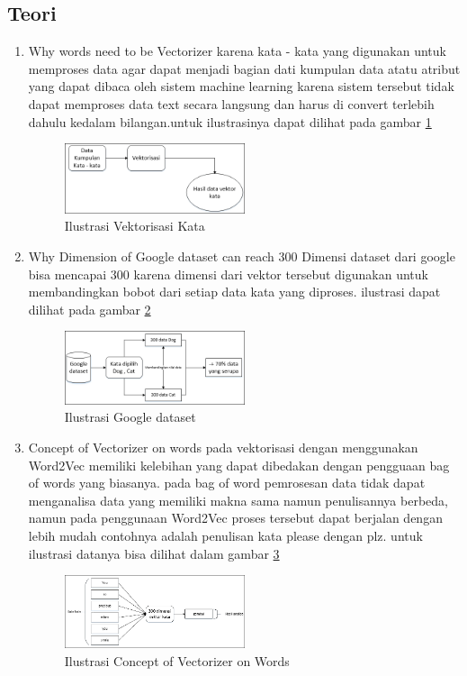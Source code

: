 \subsection{Teori}
\begin{enumerate}
\item Why words need to be Vectorizer
\subitem karena kata - kata yang digunakan untuk memproses data agar dapat menjadi bagian dati kumpulan data atatu atribut yang dapat dibaca oleh sistem machine learning karena sistem tersebut tidak dapat memproses data text secara langsung dan harus di convert terlebih dahulu kedalam bilangan.untuk ilustrasinya dapat dilihat pada gambar \ref{d1}
\begin{figure}[!htbp]
	\centering
	\includegraphics[width=0.5\textwidth]{figures/fathi/chapter5/hari1/1}
	\caption{Ilustrasi Vektorisasi Kata}
	\label{d1}
\end{figure}

\item Why Dimension of Google dataset can reach 300
\subitem Dimensi dataset dari google bisa mencapai 300 karena dimensi dari vektor tersebut digunakan untuk membandingkan bobot dari setiap data kata yang diproses. ilustrasi dapat dilihat pada gambar \ref{d2}
\begin{figure}[!htbp]
	\centering
	\includegraphics[width=0.5\textwidth]{figures/fathi/chapter5/hari1/2}
	\caption{Ilustrasi Google dataset}
	\label{d2}
\end{figure}

\item Concept of Vectorizer on words
\subitem pada vektorisasi dengan menggunakan Word2Vec memiliki kelebihan yang dapat dibedakan dengan pengguaan bag of words yang biasanya.  pada bag of word pemrosesan data tidak dapat menganalisa data yang memiliki makna sama namun penulisannya berbeda, namun pada penggunaan Word2Vec proses tersebut dapat berjalan dengan lebih mudah contohnya adalah penulisan kata please dengan plz. untuk ilustrasi datanya bisa dilihat dalam gambar \ref{d3}
\begin{figure}[!htbp]
	\centering
	\includegraphics[width=0.5\textwidth]{figures/fathi/chapter5/hari1/3}
	\caption{Ilustrasi Concept of Vectorizer on Words}
	\label{d3}
\end{figure}


\end{enumerate}
